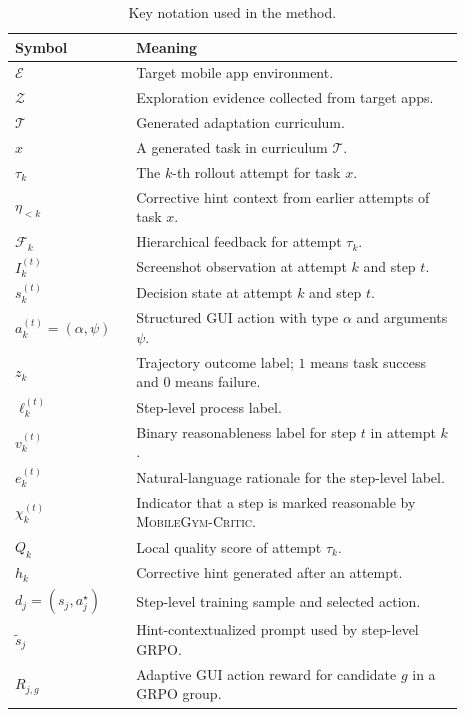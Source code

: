 \documentclass{llmxive}
\providecommand{\critic}{\textsc{MobileGym-Critic}\xspace}
\providecommand{\paperTable}{  \small
  \setlength{\tabcolsep}{4.5pt}  \renewcommand{\arraystretch}{1.12}}
\begin{document}
\begin{table}[t]
\centering
\paperTable
\begin{tabular}{L{0.23\linewidth} L{0.66\linewidth}}
\toprule
\textbf{Symbol} & \textbf{Meaning} \\
\midrule
$\mathcal{E}$ & Target mobile app environment. \\
$\mathcal{Z}$ & Exploration evidence collected from target apps. \\
$\mathcal{T}$ & Generated adaptation curriculum. \\
$x$ & A generated task in curriculum $\mathcal{T}$. \\
$\tau_k$ & The $k$-th rollout attempt for task $x$. \\
$\eta_{<k}$ & Corrective hint context from earlier attempts of task $x$. \\
$\mathcal{F}_{k}$ & Hierarchical feedback for attempt $\tau_k$. \\
$I_k^{(t)}$ & Screenshot observation at attempt $k$ and step $t$. \\
$s_k^{(t)}$ & Decision state at attempt $k$ and step $t$. \\
$a_k^{(t)}=(\alpha,\psi)$ & Structured GUI action with type $\alpha$ and arguments $\psi$. \\
$z_k$ & Trajectory outcome label; $1$ means task success and $0$ means failure. \\
$\ell_k^{(t)}$ & Step-level process label. \\
$v_k^{(t)}$ & Binary reasonableness label for step $t$ in attempt $k$. \\
$e_k^{(t)}$ & Natural-language rationale for the step-level label. \\
$\chi_k^{(t)}$ & Indicator that a step is marked reasonable by \critic. \\
$Q_k$ & Local quality score of attempt $\tau_k$. \\
$h_k$ & Corrective hint generated after an attempt. \\
$d_j=(s_j,a_j^\star)$ & Step-level training sample and selected action. \\
$\tilde{s}_j$ & Hint-contextualized prompt used by step-level GRPO. \\
$R_{j,g}$ & Adaptive GUI action reward for candidate $g$ in a GRPO group. \\
\bottomrule
\end{tabular}
\caption{Key notation used in the method.}
\label{tab:method_notation}
\end{table}
\end{document}
